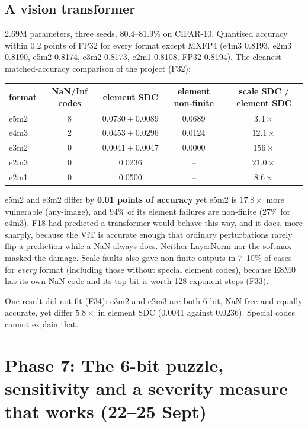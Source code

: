 \subsection{A vision transformer}
2.69M parameters, three seeds, 80.4--81.9\% on CIFAR-10. Quantised accuracy within 0.2 points of FP32 for every format except MXFP4 (e4m3 0.8193, e2m3 0.8190, e5m2 0.8174, e3m2 0.8173, e2m1 0.8108, FP32 0.8194). The cleanest matched-accuracy comparison of the project (F32):
\begin{center}
\small
\begin{tabular}{lcccc}
\toprule
format & NaN/Inf codes & element SDC & element non-finite & scale SDC / element SDC \\
\midrule
e5m2 & 8 & $0.0730\pm0.0089$ & 0.0689 & $3.4\times$ \\
e4m3 & 2 & $0.0453\pm0.0296$ & 0.0124 & $12.1\times$ \\
e3m2 & 0 & $0.0041\pm0.0047$ & 0.0000 & $156\times$ \\
e2m3 & 0 & 0.0236 & -- & $21.0\times$ \\
e2m1 & 0 & 0.0500 & -- & $8.6\times$ \\
\bottomrule
\end{tabular}
\end{center}
e5m2 and e3m2 differ by \textbf{0.01 points of accuracy} yet e5m2 is $17.8\times$ more vulnerable (any-image), and 94\% of its element failures are non-finite (27\% for e4m3). F18 had predicted a transformer would behave this way, and it does, more sharply, because the ViT is accurate enough that ordinary perturbations rarely flip a prediction while a NaN always does.
Neither LayerNorm nor the softmax masked the damage. Scale faults also gave non-finite outputs in 7--10\% of cases for \emph{every} format (including those without special element codes), because E8M0 has its own NaN code and its top bit is worth 128 exponent steps (F33).

One result did not fit (F34): e3m2 and e2m3 are both 6-bit, NaN-free and equally accurate, yet differ $5.8\times$ in element SDC (0.0041 against 0.0236). Special codes cannot explain that.

\section{Phase 7: The 6-bit puzzle, sensitivity and a severity measure that works (22--25 Sept)}

